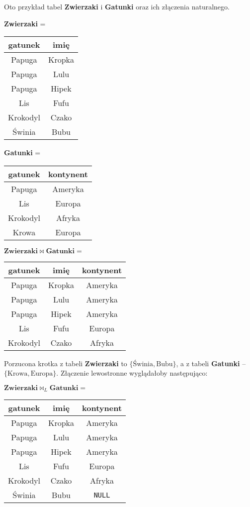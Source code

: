 \begin{example}
    Oto przykład tabel \textbf{Zwierzaki} i \textbf{Gatunki} oraz ich złączenia naturalnego.
    \begin{center}
        \textbf{Zwierzaki} =
        \begin{tabular}{c|c}
            gatunek & imię \\ \hline
            Papuga & Kropka \\
            Papuga & Lulu \\
            Papuga & Hipek \\
            Lis & Fufu \\
            Krokodyl & Czako \\
            Świnia & Bubu
        \end{tabular}
        \qquad \textbf{Gatunki} =
        \begin{tabular}{c|c}
            gatunek & kontynent \\ \hline
            Papuga & Ameryka \\
            Lis & Europa \\
            Krokodyl & Afryka \\
            Krowa & Europa
        \end{tabular}
        \qquad $\textbf{Zwierzaki} \bowtie \textbf{Gatunki} = $
        \begin{tabular}{c|c|c}
            gatunek & imię & kontynent \\ \hline
            Papuga & Kropka & Ameryka \\
            Papuga & Lulu & Ameryka  \\
            Papuga & Hipek & Ameryka \\
            Lis & Fufu & Europa \\
            Krokodyl & Czako & Afryka
        \end{tabular}
    \end{center}

    Porzucona krotka z tabeli \textbf{Zwierzaki} to $\{\text{Świnia}, \text{Bubu}\}$, a z tabeli \textbf{Gatunki} -- $\{\text{Krowa}, \text{Europa}\}$. Złączenie lewostronne wyglądałoby następująco:
    \begin{center}
        $\textbf{Zwierzaki} \bowtie_L \textbf{Gatunki} = $
        \begin{tabular}{c|c|c}
            gatunek & imię & kontynent \\ \hline
            Papuga & Kropka & Ameryka \\
            Papuga & Lulu & Ameryka  \\
            Papuga & Hipek & Ameryka \\
            Lis & Fufu & Europa \\
            Krokodyl & Czako & Afryka \\
            Świnia & Bubu & \texttt{NULL}
        \end{tabular}
    \end{center}
    
\end{example}

